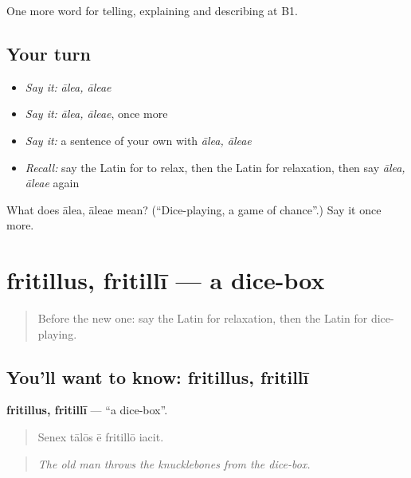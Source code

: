 \begin{grammarlens}[title={What you've built}]
One more word for telling, explaining and describing at B1.
\end{grammarlens}

\subsection*{Your turn}
\begin{itemize}
\raggedright
  \item \emph{Say it:} \emph{ālea, āleae}
  \item \emph{Say it:} \emph{ālea, āleae}, once more
  \item \emph{Say it:} a sentence of your own with \emph{ālea, āleae}
  \item \emph{Recall:} say the Latin for to relax, then the Latin for relaxation, then say \emph{ālea, āleae} again
\end{itemize}

\begin{tcolorbox}[breakable,colback=teal!4,colframe=teal!35!black,title={Before you move on}]
What does ālea, āleae mean? (\textquotedblleft{}Dice-playing, a game of chance\textquotedblright{}.) Say it once more.
\end{tcolorbox}
\section[fritillus, fritillī]{fritillus, fritillī — a dice-box}

\label{lesson:LA-C539-fritillus}



\begin{quote}
Before the new one: say the Latin for relaxation, then the Latin for dice-playing.
\end{quote}

\subsection*{You'll want to know: fritillus, fritillī}
\textbf{fritillus, fritillī} — \textquotedblleft{}a dice-box\textquotedblright{}.

\begin{quote}
Senex tālōs ē fritillō iacit.
\end{quote}

\begin{quote}
\emph{The old man throws the knucklebones from the dice-box.}
\end{quote}

